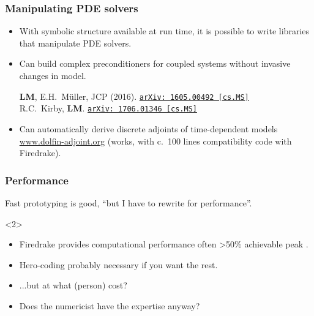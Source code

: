 \documentclass[presentation]{beamer}
\newcommand{\arxivlink}[2]{%
  \href{http://www.arxiv.org/abs/#1}%
  {\texttt{arXiv:\,#1\,[#2]}}%
}
\begin{document}
\begin{frame}[fragile]
\begin{uncoverenv}
  \end{uncoverenv}
\end{frame}

\begin{frame}
  \frametitle{Manipulating PDE solvers}
  \begin{itemize}
  \item With symbolic structure available at run time, it is possible
    to write libraries that manipulate PDE solvers.
  \item Can build complex preconditioners for coupled systems without
    invasive changes in model.
    \begin{flushright}
      {\scriptsize \textbf{LM}, E.H.~M\"uller, JCP (2016).
        \arxivlink{1605.00492}{cs.MS}}\\
      {\scriptsize R.C.~Kirby, \textbf{LM}. \arxivlink{1706.01346}{cs.MS}}
    \end{flushright}
  \item Can automatically derive discrete adjoints of
    time-dependent models \url{www.dolfin-adjoint.org} (works, with
    c.~100 lines compatibility code with Firedrake).
  \end{itemize}
\end{frame}

\begin{frame}
  \frametitle{Performance}
  Fast prototyping is good, ``but I have to rewrite for performance''.

  \begin{uncoverenv}<2>
    \begin{itemize}
    \item Firedrake provides computational performance often >50\%
      achievable peak \parencite{Luporini:2015,Bercea:2016,Mitchell:2016}.
    \item Hero-coding probably necessary if you want the rest.
    \item ...but at what (person) cost?
    \item Does the numericist have the expertise anyway?
    \end{itemize}
  \end{uncoverenv}
\end{frame}
\end{document}
